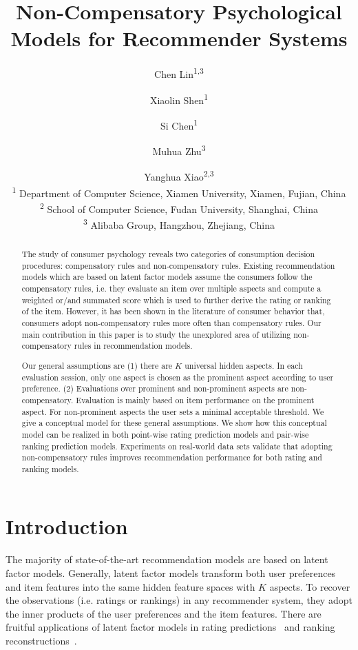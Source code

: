 \documentclass[letterpaper]{article} %
\begin{document}
\title{Non-Compensatory Psychological Models for Recommender Systems}
\author{Chen Lin\textsuperscript{1,3}  \and Xiaolin Shen\textsuperscript{1}  \and Si Chen\textsuperscript{1}  \and Muhua Zhu\textsuperscript{3}  \and Yanghua Xiao\textsuperscript{2,3}\\
\textsuperscript{1} Department of Computer Science, Xiamen University, Xiamen, Fujian, China\\
\textsuperscript{2} School of Computer Science, Fudan University, Shanghai, China \\
\textsuperscript{3} Alibaba Group, Hangzhou, Zhejiang, China
}
\maketitle
\begin{abstract}
The study of consumer psychology reveals two categories of consumption decision procedures: compensatory rules and non-compensatory rules. Existing recommendation models which are based on latent factor models assume the consumers follow the compensatory rules, i.e. they evaluate an item over multiple aspects and compute a weighted or/and summated score which is used to further derive the rating or ranking of the item. However, it has been shown in the literature of consumer behavior that, consumers adopt non-compensatory rules more often than compensatory rules. Our main contribution in this paper is to study the unexplored area of utilizing non-compensatory rules in recommendation models. 

Our general assumptions are (1) there are $K$ universal hidden aspects. In each evaluation session, only one aspect is chosen as the prominent aspect according to user preference. (2) Evaluations over prominent and non-prominent aspects are non-compensatory. Evaluation is mainly based on item performance on the prominent aspect. For non-prominent aspects the user sets a minimal acceptable threshold. We give a conceptual model for these general assumptions. We show how this conceptual model can be realized in both point-wise rating prediction models and pair-wise ranking prediction models. Experiments on real-world data sets validate that adopting non-compensatory rules improves recommendation performance for both rating and ranking models.
\end{abstract}


\section{Introduction}\label{sec:introduction}
The majority of state-of-the-art recommendation models are based on latent factor models. Generally, latent factor models transform both user preferences and item features into the same hidden feature spaces with $K$ aspects. To recover the observations (i.e. ratings or rankings) in any recommender system, they adopt the inner products of the user preferences and the item features. There are fruitful applications of latent factor models in  rating predictions~\cite{Koren2009Matrix,Koren2010Factor,Lee2014Local} and ranking reconstructions~\cite{Rendle2009BPR,Steck2015Gaussian,Zhao2018Factored,Shi2010List}.   
\end{document}
